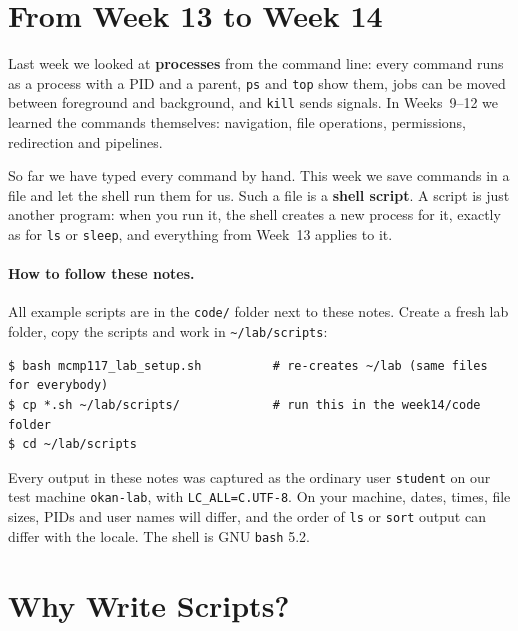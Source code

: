 \documentclass[11pt,a4paper]{article}
\newcommand{\term}[1]{\textbf{\color{mintdeep}#1}}
\newcommand{\cmd}[1]{\texttt{#1}}
\begin{document}
\setcounter{tocdepth}{1}
\tableofcontents

\section{From Week 13 to Week 14}

Last week we looked at \term{processes} from the command line: every command runs as a process with a PID and a parent, \cmd{ps} and \cmd{top} show them, jobs can be moved between foreground and background, and \cmd{kill} sends signals. In Weeks~9--12 we learned the commands themselves: navigation, file operations, permissions, redirection and pipelines.

So far we have typed every command by hand. This week we save commands in a file and let the shell run them for us. Such a file is a \term{shell script}. A script is just another program: when you run it, the shell creates a new process for it, exactly as for \cmd{ls} or \cmd{sleep}, and everything from Week~13 applies to it.

\paragraph{How to follow these notes.} All example scripts are in the \texttt{code/} folder next to these notes. Create a fresh lab folder, copy the scripts and work in \texttt{\textasciitilde/lab/scripts}:
\begin{lstlisting}[style=term]
$ bash mcmp117_lab_setup.sh          # re-creates ~/lab (same files for everybody)
$ cp *.sh ~/lab/scripts/             # run this in the week14/code folder
$ cd ~/lab/scripts
\end{lstlisting}
Every output in these notes was captured as the ordinary user \texttt{student} on our test machine \texttt{okan-lab}, with \texttt{LC\_ALL=C.UTF-8}. On your machine, dates, times, file sizes, PIDs and user names will differ, and the order of \cmd{ls} or \cmd{sort} output can differ with the locale. The shell is GNU \texttt{bash} 5.2.

\section{Why Write Scripts?}
\end{document}
